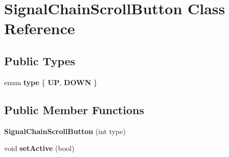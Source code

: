 \hypertarget{classSignalChainScrollButton}{\section{Signal\-Chain\-Scroll\-Button Class Reference}
\label{classSignalChainScrollButton}
}
\subsection*{Public Types}
\begin{DoxyCompactItemize}
\item 
enum {\bfseries type} \{ {\bfseries U\-P}, 
{\bfseries D\-O\-W\-N}
 \}
\end{DoxyCompactItemize}
\subsection*{Public Member Functions}
\begin{DoxyCompactItemize}
\item 
\hypertarget{classSignalChainScrollButton_a5fddb0fbc5fd4a2fead7884a06852207}{{\bfseries Signal\-Chain\-Scroll\-Button} (int type)}\label{classSignalChainScrollButton_a5fddb0fbc5fd4a2fead7884a06852207}

\item 
\hypertarget{classSignalChainScrollButton_a5e7091c485f0dee550c8b881d016edd6}{void {\bfseries set\-Active} (bool)}\label{classSignalChainScrollButton_a5e7091c485f0dee550c8b881d016edd6}

\end{DoxyCompactItemize}
